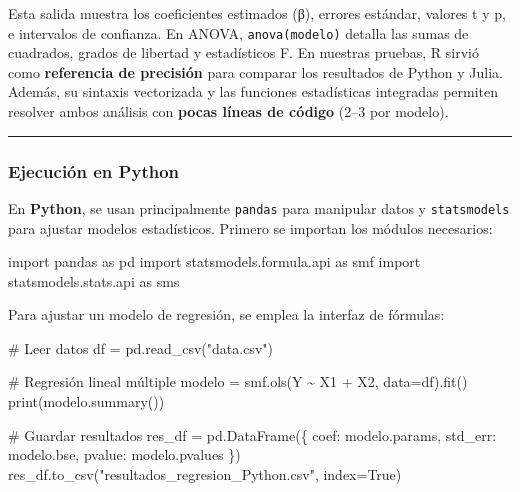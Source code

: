 \documentclass[
  letterpaper,
  DIV=11,
  numbers=noendperiod]{scrartcl}
\newenvironment{Shaded}{\begin{snugshade}}{\end{snugshade}}
\newcommand{\BuiltInTok}[1]{\textcolor[rgb]{0.00,0.23,0.31}{#1}}
\newcommand{\CommentTok}[1]{\textcolor[rgb]{0.37,0.37,0.37}{#1}}
\newcommand{\ImportTok}[1]{\textcolor[rgb]{0.00,0.46,0.62}{#1}}
\newcommand{\NormalTok}[1]{\textcolor[rgb]{0.00,0.23,0.31}{#1}}
\newcommand{\OperatorTok}[1]{\textcolor[rgb]{0.37,0.37,0.37}{#1}}
\newcommand{\StringTok}[1]{\textcolor[rgb]{0.13,0.47,0.30}{#1}}
\newcommand{\VariableTok}[1]{\textcolor[rgb]{0.07,0.07,0.07}{#1}}
\begin{document}
Esta salida muestra los coeficientes estimados (β), errores estándar,
valores t y p, e intervalos de confianza. En ANOVA,
\texttt{anova(modelo)} detalla las sumas de cuadrados, grados de
libertad y estadísticos F. En nuestras pruebas, R sirvió como
\textbf{referencia de precisión} para comparar los resultados de Python
y Julia. Además, su sintaxis vectorizada y las funciones estadísticas
integradas permiten resolver ambos análisis con \textbf{pocas líneas de
código} (2--3 por modelo).

\begin{center}\rule{0.5\linewidth}{0.5pt}\end{center}

\subsubsection{\texorpdfstring{\textbf{Ejecución en
Python}}{Ejecución en Python}}\label{ejecuciuxf3n-en-python}

En \textbf{Python}, se usan principalmente \texttt{pandas} para
manipular datos y \texttt{statsmodels} para ajustar modelos
estadísticos. Primero se importan los módulos necesarios:

\begin{Shaded}
\begin{Highlighting}[]
\ImportTok{import}\NormalTok{ pandas }\ImportTok{as}\NormalTok{ pd}
\ImportTok{import}\NormalTok{ statsmodels.formula.api }\ImportTok{as}\NormalTok{ smf}
\ImportTok{import}\NormalTok{ statsmodels.stats.api }\ImportTok{as}\NormalTok{ sms}
\end{Highlighting}
\end{Shaded}

Para ajustar un modelo de regresión, se emplea la interfaz de fórmulas:

\begin{Shaded}
\begin{Highlighting}[]
\CommentTok{\# Leer datos}
\NormalTok{df }\OperatorTok{=}\NormalTok{ pd.read\_csv(}\StringTok{"data.csv"}\NormalTok{)}

\CommentTok{\# Regresión lineal múltiple}
\NormalTok{modelo }\OperatorTok{=}\NormalTok{ smf.ols(}\StringTok{\textquotesingle{}Y \textasciitilde{} X1 + X2\textquotesingle{}}\NormalTok{, data}\OperatorTok{=}\NormalTok{df).fit()}
\BuiltInTok{print}\NormalTok{(modelo.summary())}

\CommentTok{\# Guardar resultados}
\NormalTok{res\_df }\OperatorTok{=}\NormalTok{ pd.DataFrame(\{}
    \StringTok{\textquotesingle{}coef\textquotesingle{}}\NormalTok{: modelo.params,}
    \StringTok{\textquotesingle{}std\_err\textquotesingle{}}\NormalTok{: modelo.bse,}
    \StringTok{\textquotesingle{}pvalue\textquotesingle{}}\NormalTok{: modelo.pvalues}
\NormalTok{\})}
\NormalTok{res\_df.to\_csv(}\StringTok{"resultados\_regresion\_Python.csv"}\NormalTok{, index}\OperatorTok{=}\VariableTok{True}\NormalTok{)}
\end{Highlighting}
\end{Shaded}
\end{document}

